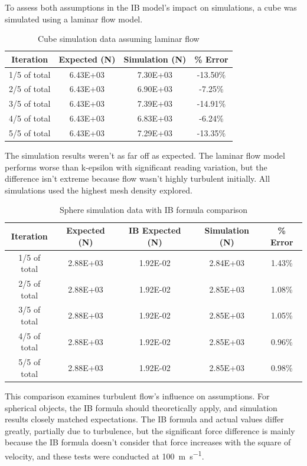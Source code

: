 \documentclass[12pt,a4paper]{article}
\begin{document}
To assess both assumptions in the IB model's impact on simulations, a cube was simulated using a laminar flow model.

\begin{table}[H]
\centering
\caption{Cube simulation data assuming laminar flow}
\label{tab:laminar_comparison}
\begin{tabular}{|c|c|c|c|}
\hline
\rowcolor{lightblue}
\textbf{Iteration} & \textbf{Expected (N)} & \textbf{Simulation (N)} & \textbf{\% Error} \\
\hline
1/5 of total & 6.43E+03 & 7.30E+03 & -13.50\% \\
\hline
2/5 of total & 6.43E+03 & 6.90E+03 & -7.25\% \\
\hline
3/5 of total & 6.43E+03 & 7.39E+03 & -14.91\% \\
\hline
4/5 of total & 6.43E+03 & 6.83E+03 & -6.24\% \\
\hline
5/5 of total & 6.43E+03 & 7.29E+03 & -13.35\% \\
\hline
\end{tabular}
\end{table}

The simulation results weren't as far off as expected. The laminar flow model performs worse than k-epsilon with significant reading variation, but the difference isn't extreme because flow wasn't highly turbulent initially. All simulations used the highest mesh density explored.

\begin{table}[H]
\centering
\caption{Sphere simulation data with IB formula comparison}
\label{tab:ib_comparison}
\begin{tabular}{|c|c|c|c|c|}
\hline
\rowcolor{lightblue}
\textbf{Iteration} & \textbf{Expected (N)} & \textbf{IB Expected (N)} & \textbf{Simulation (N)} & \textbf{\% Error} \\
\hline
1/5 of total & 2.88E+03 & 1.92E-02 & 2.84E+03 & 1.43\% \\
\hline
2/5 of total & 2.88E+03 & 1.92E-02 & 2.85E+03 & 1.08\% \\
\hline
3/5 of total & 2.88E+03 & 1.92E-02 & 2.85E+03 & 1.05\% \\
\hline
4/5 of total & 2.88E+03 & 1.92E-02 & 2.85E+03 & 0.96\% \\
\hline
5/5 of total & 2.88E+03 & 1.92E-02 & 2.85E+03 & 0.98\% \\
\hline
\end{tabular}
\end{table}

This comparison examines turbulent flow's influence on assumptions. For spherical objects, the IB formula should theoretically apply, and simulation results closely matched expectations. The IB formula and actual values differ greatly, partially due to turbulence, but the significant force difference is mainly because the IB formula doesn't consider that force increases with the square of velocity, and these tests were conducted at \SI{100}{\meter\per\second}.
\end{document}
